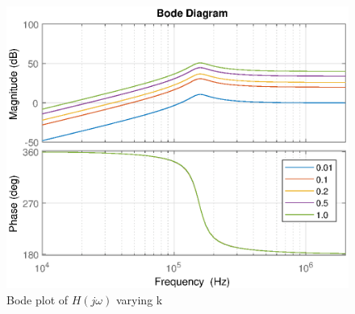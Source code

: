 \begin{figure}[H]
    \centering
    \includegraphics[width=\textwidth]{img/CoilRigBode_k.eps}
    \caption{Bode plot of $H(j\omega)$ varying k}
    \label{fig:bode_k}
\end{figure}
